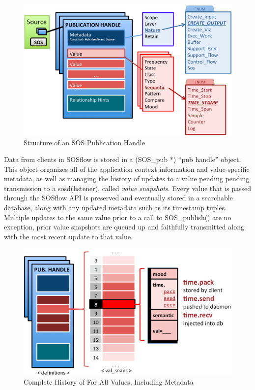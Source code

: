 \begin{figure}[!t]
\centering
\includegraphics[width=5in]{images/pub_handle.png}
\caption{Structure of an SOS Publication Handle}
\label{fig_sim}
\end{figure}


Data from clients in SOSflow is stored in a (SOS\_pub *) ``pub handle''
object. This object organizes all of the application context
information and value-specific metadata, as well as managing the
history of updates to a value pending pending transmission to a
sosd(listener), called \textit{value snapshots}. Every value that is
passed through the SOSflow API is preserved and eventually stored in a
searchable database, along with any updated metadata such as its
timestamp tuples.  Multiple updates to the same value prior to a call
to SOS\_publish() are no exception, prior value snapshots are queued
up and faithfully transmitted along with the most recent update to
that value.

\begin{figure}[!t]
\centering
\includegraphics[width=5in]{images/val_snaps.png}
\caption{Complete History of For All Values, Including Metadata}
\label{fig_sim}
\end{figure}


